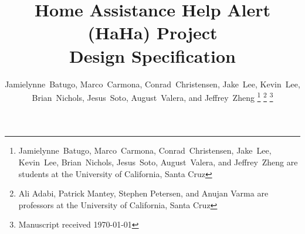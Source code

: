 \documentclass[journal]{IEEEtran}
\begin{document}
%
\title{
  Home Assistance Help Alert (HaHa) Project \\
  Design Specification
}
%
%
%

\author{Jamielynne~Batugo, Marco~Carmona, Conrad~Christensen, Jake~Lee, Kevin~Lee, Brian~Nichols, Jesus~Soto, August~Valera, and Jeffrey~Zheng%
  \thanks{Jamielynne~Batugo, Marco~Carmona, Conrad~Christensen, Jake~Lee, Kevin~Lee, Brian~Nichols, Jesus~Soto, August~Valera, and Jeffrey~Zheng are students at the University of California, Santa Cruz}%
  \thanks{Ali Adabi, Patrick Mantey, Stephen Petersen, and Anujan Varma are professors at the University of California, Santa Cruz}%
\thanks{Manuscript received \today}}

%
%
\end{document}
